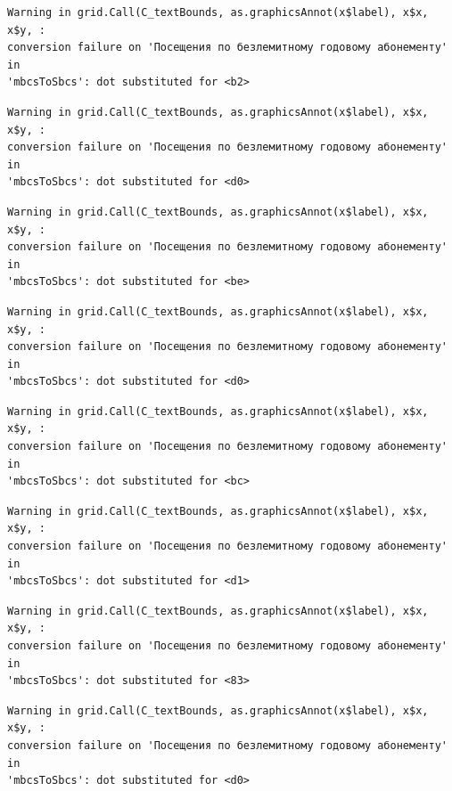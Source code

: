 \documentclass[
  letterpaper,
  DIV=11,
  numbers=noendperiod]{scrartcl}
\begin{document}
\begin{verbatim}
Warning in grid.Call(C_textBounds, as.graphicsAnnot(x$label), x$x, x$y, :
conversion failure on 'Посещения по безлемитному годовому абонементу' in
'mbcsToSbcs': dot substituted for <b2>
\end{verbatim}

\begin{verbatim}
Warning in grid.Call(C_textBounds, as.graphicsAnnot(x$label), x$x, x$y, :
conversion failure on 'Посещения по безлемитному годовому абонементу' in
'mbcsToSbcs': dot substituted for <d0>
\end{verbatim}

\begin{verbatim}
Warning in grid.Call(C_textBounds, as.graphicsAnnot(x$label), x$x, x$y, :
conversion failure on 'Посещения по безлемитному годовому абонементу' in
'mbcsToSbcs': dot substituted for <be>
\end{verbatim}

\begin{verbatim}
Warning in grid.Call(C_textBounds, as.graphicsAnnot(x$label), x$x, x$y, :
conversion failure on 'Посещения по безлемитному годовому абонементу' in
'mbcsToSbcs': dot substituted for <d0>
\end{verbatim}

\begin{verbatim}
Warning in grid.Call(C_textBounds, as.graphicsAnnot(x$label), x$x, x$y, :
conversion failure on 'Посещения по безлемитному годовому абонементу' in
'mbcsToSbcs': dot substituted for <bc>
\end{verbatim}

\begin{verbatim}
Warning in grid.Call(C_textBounds, as.graphicsAnnot(x$label), x$x, x$y, :
conversion failure on 'Посещения по безлемитному годовому абонементу' in
'mbcsToSbcs': dot substituted for <d1>
\end{verbatim}

\begin{verbatim}
Warning in grid.Call(C_textBounds, as.graphicsAnnot(x$label), x$x, x$y, :
conversion failure on 'Посещения по безлемитному годовому абонементу' in
'mbcsToSbcs': dot substituted for <83>
\end{verbatim}

\begin{verbatim}
Warning in grid.Call(C_textBounds, as.graphicsAnnot(x$label), x$x, x$y, :
conversion failure on 'Посещения по безлемитному годовому абонементу' in
'mbcsToSbcs': dot substituted for <d0>
\end{verbatim}
\end{document}
